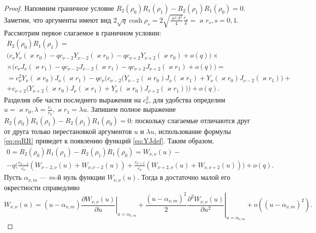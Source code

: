 \begin{proof}
Напомним граничное условие $R_2(\rho_0) R_1(\rho_1) - R_2(\rho_1) R_1(\rho_0) = 0$. Заметим, что аргументы имеют вид $2 \sqrt{q} \cosh{\rho_s} = 2 \sqrt{\frac{\varkappa^2 \delta^2}{4}} \frac{r_s}{\delta} = \varkappa r_s, s=0,1$. Рассмотрим первое слагаемое в граничном условии:
\begin{multline}
	R_2(\rho_0) R_1(\rho_1) = \\
\bigg(
c_\nu Y_\nu(\varkappa r_0) - 
	q c_{\nu-2} Y_{\nu-2}(\varkappa r_0) -
	q c_{\nu+2} Y_{\nu+2}(\varkappa r_0) + o(q)
\bigg) \times \\
\times \bigg(
c_\nu J_\nu(\varkappa r_1) - 
	q c_{\nu-2} J_{\nu-2}(\varkappa r_1) -
	q c_{\nu+2} J_{\nu+2}(\varkappa r_1) + o(q)
\bigg) = \\
= c_\nu^2 Y_\nu(\varkappa r_0)J_\nu(\varkappa r_1) - 
	q c_\nu \bigg(    c_{\nu-2} 
	\big(
	Y_{\nu-2}(\varkappa r_0)J_\nu(\varkappa r_1) + Y_{\nu}(\varkappa r_0)J_{\nu-2}(\varkappa r_1)
	\big)+ \\
	  +  c_{\nu+2} 
	\big(
	Y_{\nu+2}(\varkappa r_0)J_\nu(\varkappa r_1) + Y_{\nu}(\varkappa r_0)J_{\nu+2}(\varkappa r_1)
	\big)
\bigg) + o(q).
\label{eq:eqRR}
\end{multline}
Разделив обе части последнего выражения на $c_\nu^2$, для удобства определим $u = \varkappa r_0, \lambda = \frac{r_1}{r_0}, \varkappa r_1 = \lambda u$. Запишем полное выражение $R_2(\rho_0) R_1(\rho_1) - R_2(\rho_1) R_1(\rho_0) = 0$: поскольку слагаемые отличаются друг от друга только перестановкой аргументов $u$ и $\lambda u$, использование формулы \eqref{eq:eqRR} приведет к появлению функций \eqref{eq:YJdef}. Таким образом,
\begin{multline}
	0 = R_2(\rho_0) R_1(\rho_1) - R_2(\rho_1) R_1(\rho_0)  =  W_{\nu, \nu}(u) - \\
	- q \bigg(    
	\frac{c_{\nu-2}}{c_\nu}
	\left(
	W_{\nu-2, \nu}(u) + W_{\nu, \nu-2}(u)
	\right)+ 
	\frac{c_{\nu+2}}{c_\nu}
	\left(
	W_{\nu+2, \nu}(u) + W_{\nu, \nu+2}(u)
	\right)
\bigg) + o(q).
\label{eq:25}
\end{multline}
Пусть $\alpha_{\nu, m}$ --- $m$-й нуль функции $W_{\nu, \nu}(u)$. Тогда в достаточно малой его окрестности справедливо 
$$
W_{\nu, \nu}(u) = (u - \alpha_{\nu, m}) \left.
\frac{\partial W_{\nu, \nu}(u)}{\partial u}
\right|_{u=\alpha_{\nu, m}} + 
\frac{ (u - \alpha_{\nu, m})^2 }{2} \left.
\frac{\partial^2 W_{\nu, \nu}(u)}{\partial u^2}
\right|_{u=\alpha_{\nu, m}} + o((u - \alpha_{\nu, m})^2).
$$


\end{proof}
